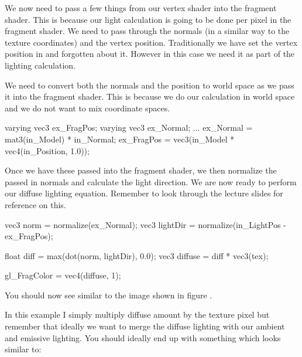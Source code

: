 \documentclass[10pt]{article}
\begin{document}
We now need to pass a few things from our vertex shader into the
fragment shader. This is because our light calculation is going to
be done per pixel in the fragment shader. We need to pass through
the normals (in a similar way to the texture coordinates) and the
vertex position. Traditionally we have set the vertex position in
 and forgotten about it. However in this case we need
it as part of the lighting calculation.

We need to convert both the normals and the position to world space as we pass it into the
fragment shader. This is because we do our calculation in world space and we do not want to mix coordinate spaces.


\begin{Code}

varying vec3 ex_FragPos;
varying vec3 ex_Normal;
...
ex_Normal = mat3(in_Model) * in_Normal;
ex_FragPos = vec3(in_Model * vec4(in_Position, 1.0));

\end{Code}

Once we have these passed into the fragment shader, we then normalize the
passed in normals and calculate the light direction.  We are now ready
to perform our diffuse lighting equation.  Remember to look through the
lecture slides for reference on this.

\begin{Code}

vec3 norm = normalize(ex_Normal);
vec3 lightDir = normalize(in_LightPos - ex_FragPos);

float diff = max(dot(norm, lightDir), 0.0);
vec3 diffuse = diff * vec3(tex);

gl_FragColor = vec4(diffuse, 1);

\end{Code}

You should now see similar to the image shown in figure .

In this example I simply multiply diffuse amount by the texture pixel
but remember that ideally we want to merge the diffuse lighting with our
ambient and emissive lighting. You should ideally end up with something
which looks similar to:
\end{document}
